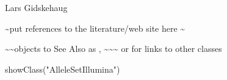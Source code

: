 \documentclass[letterpaper]{book}
\begin{document}
%
\begin{Author}\relax
Lars Gidskehaug
\end{Author}
%
\begin{References}\relax
 \textasciitilde{}put references to the literature/web site here \textasciitilde{} 
\end{References}
%
\begin{SeeAlso}\relax
\textasciitilde{}\textasciitilde{}objects to See Also as , \textasciitilde{}\textasciitilde{}\textasciitilde{}
or  for links to other classes
\end{SeeAlso}
%
\begin{Examples}
\begin{ExampleCode}
showClass("AlleleSetIllumina")
\end{ExampleCode}
\end{Examples}
\printindex{}
\end{document}
